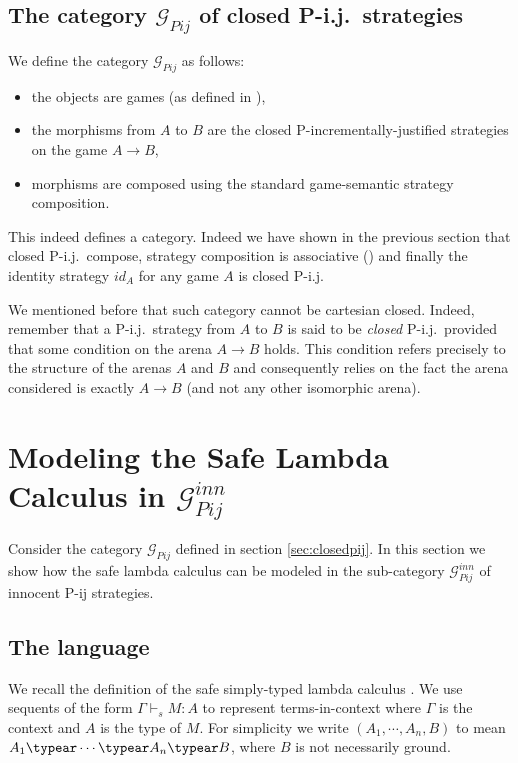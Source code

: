 \subsection{The category $\mathcal{G}_{Pij}$ of closed P-i.j.\ strategies}

We define the category $\mathcal{G}_{Pij}$ as follows:
\begin{itemize}
\item the objects are games (as defined in \cite{abramsky:game-semantics-tutorial}),
\item the morphisms from $A$ to $B$ are the closed P-incrementally-justified strategies
on the game $A\rightarrow B$,
\item morphisms are composed using the standard game-semantic strategy composition.
\end{itemize}
This indeed defines a category. Indeed we have shown in the previous
section that closed P-i.j.\ compose, strategy composition is
associative (\cite{abramsky94full,hylandong_pcf}) and finally the
identity strategy $id_A$ for any game $A$ is closed P-i.j.

We mentioned before that such category cannot be cartesian closed. Indeed, remember that
a P-i.j.\ strategy from $A$ to $B$ is said to be \emph{closed} P-i.j.\ provided that some condition
on the arena $A\rightarrow B$ holds. This condition refers precisely to the structure of the arenas $A$ and $B$ and consequently relies on the fact the arena considered is exactly $A\rightarrow B$ (and not any other isomorphic arena).



\section{Modeling the Safe Lambda Calculus in $\mathcal{G}_{Pij}^{inn}$}

Consider the category $\mathcal{G}_{Pij}$ defined in section
\ref{sec:closedpij}. In this section we show how the safe lambda
calculus can be modeled in the sub-category
$\mathcal{G}_{Pij}^{inn}$ of innocent P-ij strategies.

\subsection{The language}
We recall the definition of the safe simply-typed lambda calculus
\cite{blumong:safelambdacalculus}.  We use sequents of the form
$\Gamma \vdash_s M : A$ to represent terms-in-context where $\Gamma$
is the context and $A$ is the type of $M$. For simplicity we write
$(A_1, \cdots, A_n, B)$ to mean $A_1 \typear \cdots \typear A_n
\typear B$, where $B$ is not necessarily ground.

